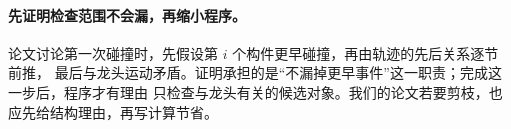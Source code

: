 \paragraph{先证明检查范围不会漏，再缩小程序。}
论文讨论第一次碰撞时，先假设第 $i$ 个构件更早碰撞，再由轨迹的先后关系逐节前推，
最后与龙头运动矛盾。证明承担的是“不漏掉更早事件”这一职责；完成这一步后，程序才有理由
只检查与龙头有关的候选对象。我们的论文若要剪枝，也应先给结构理由，再写计算节省。

